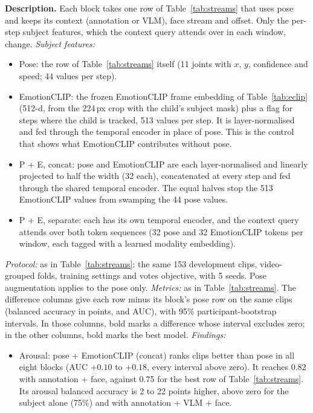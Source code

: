 \documentclass[11pt]{article}
\newcommand{\tabledesc}[1]{\par\medskip\begin{minipage}{\linewidth}\footnotesize\textbf{Description.} #1\end{minipage}}
\begin{document}
\begin{table}[!htbp]
{\begin{tabular}{llcccccccccc}
\bottomrule
\end{tabular}%
}
\tabledesc{Each block takes one row of Table~\ref{tab:streams} that uses pose and keeps its context (annotation or VLM), face stream and offset. Only the per-step subject features, which the context query attends over in each window, change.
\emph{Subject features:}
\begin{itemize}
  \item Pose: the row of Table~\ref{tab:streams} itself (11 joints with $x$, $y$, confidence and speed; 44 values per step).
  \item EmotionCLIP: the frozen EmotionCLIP frame embedding of Table~\ref{tab:eclip} (512-d, from the 224\,px crop with the child's subject mask) plus a flag for steps where the child is tracked, 513 values per step. It is layer-normalised and fed through the temporal encoder in place of pose. This is the control that shows what EmotionCLIP contributes without pose.
  \item P + E, concat: pose and EmotionCLIP are each layer-normalised and linearly projected to half the width (32 each), concatenated at every step and fed through the shared temporal encoder. The equal halves stop the 513 EmotionCLIP values from swamping the 44 pose values.
  \item P + E, separate: each has its own temporal encoder, and the context query attends over both token sequences (32 pose and 32 EmotionCLIP tokens per window, each tagged with a learned modality embedding).
\end{itemize}
\emph{Protocol:} as in Table~\ref{tab:streams}: the same 153 development clips, video-grouped folds, training settings and votes objective, with 5 seeds. Pose augmentation applies to the pose only.
\emph{Metrics:} as in Table~\ref{tab:streams}. The difference columns give each row minus its block's pose row on the same clips (balanced accuracy in points, and AUC), with 95\% participant-bootstrap intervals. In those columns, bold marks a difference whose interval excludes zero; in the other columns, bold marks the best model.
\emph{Findings:}
\begin{itemize}
  \item Arousal: pose + EmotionCLIP (concat) ranks clips better than pose in all eight blocks (AUC $+0.10$ to $+0.18$, every interval above zero). It reaches 0.82 with annotation + face, against 0.75 for the best row of Table~\ref{tab:streams}. Its arousal balanced accuracy is 2 to 22 points higher, above zero for the subject alone (75\%) and with annotation + VLM + face.

\end{itemize}}
\end{table}
\end{document}
